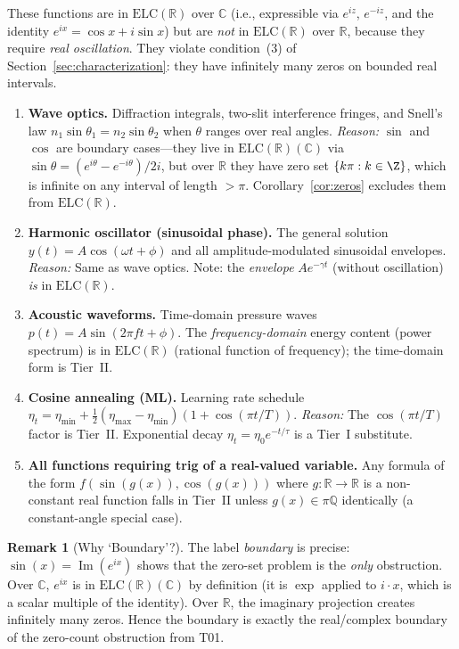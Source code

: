 \documentclass[12pt,a4paper]{article}
\theoremstyle{definition}
\newtheorem{remark}[theorem]{Remark}
\newcommand{\ELC}{\mathrm{ELC}(\mathbb{R})}
\newcommand{\R}{\mathbb{R}}
\newcommand{\C}{\mathbb{C}}
\newcommand{\Q}{\mathbb{Q}}
\begin{document}
These functions are in $\ELC$ over $\C$ (i.e., expressible via $e^{iz}$,
$e^{-iz}$, and the identity $e^{ix}=\cos x + i\sin x$) but are \emph{not}
in $\ELC$ over $\R$, because they require \emph{real oscillation}.
They violate condition~(3) of Section~\ref{sec:characterization}:
they have infinitely many zeros on bounded real intervals.

\begin{enumerate}[label=\textbf{\arabic*.}, leftmargin=*, itemsep=8pt]

\item \textbf{Wave optics.}
  Diffraction integrals, two-slit interference fringes,
  and Snell's law $n_1\sin\theta_1 = n_2\sin\theta_2$ when $\theta$ ranges
  over real angles.
  \emph{Reason:} $\sin$ and $\cos$ are boundary cases---they live in
  $\ELC(\C)$ via $\sin\theta=(e^{i\theta}-e^{-i\theta})/2i$,
  but over $\R$ they have zero set $\{k\pi : k\in\Z\}$, which is
  infinite on any interval of length $>\pi$. Corollary~\ref{cor:zeros}
  excludes them from $\ELC$.

\item \textbf{Harmonic oscillator (sinusoidal phase).}
  The general solution $y(t) = A\cos(\omega t + \phi)$ and
  all amplitude-modulated sinusoidal envelopes.
  \emph{Reason:} Same as wave optics.
  Note: the \emph{envelope} $A e^{-\gamma t}$ (without oscillation)
  \textit{is} in $\ELC$.

\item \textbf{Acoustic waveforms.}
  Time-domain pressure waves $p(t)=A\sin(2\pi f t+\phi)$.
  The \emph{frequency-domain} energy content (power spectrum) is in $\ELC$
  (rational function of frequency); the time-domain form is Tier~II.

\item \textbf{Cosine annealing (ML).}
  Learning rate schedule $\eta_t = \eta_{\min} +
  \tfrac{1}{2}(\eta_{\max}-\eta_{\min})(1+\cos(\pi t/T))$.
  \emph{Reason:} The $\cos(\pi t/T)$ factor is Tier~II.
  Exponential decay $\eta_t = \eta_0 e^{-t/\tau}$ is a Tier~I substitute.

\item \textbf{All functions requiring trig of a real-valued variable.}
  Any formula of the form $f(\sin(g(x)), \cos(g(x)))$ where $g:\R\to\R$
  is a non-constant real function falls in Tier~II unless
  $g(x)\in\pi\Q$ identically (a constant-angle special case).

\end{enumerate}

\begin{remark}[Why `Boundary'?]
The label \emph{boundary} is precise: $\sin(x)=\operatorname{Im}(e^{ix})$
shows that the zero-set problem is the \emph{only} obstruction.
Over $\C$, $e^{ix}$ is in $\ELC(\C)$ by definition (it is $\exp$ applied to
$i\cdot x$, which is a scalar multiple of the identity).
Over $\R$, the imaginary projection creates infinitely many zeros.
Hence the boundary is exactly the real/complex boundary of the zero-count
obstruction from T01.
\end{remark}
\end{document}
